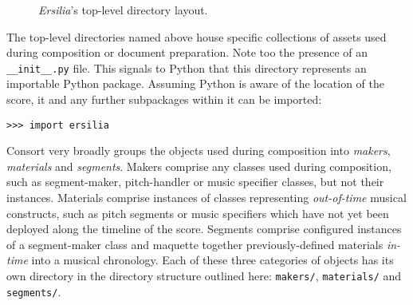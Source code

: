 \begin{figure}[h!]
\begin{singlespacing}
\vspace{-0.5\baselineskip}
\noindent%
\end{singlespacing}
\caption{\emph{Ersilia}'s top-level directory layout.}
\end{figure}

\noindent The top-level directories named above house specific collections of
assets used during composition or document preparation. Note too the presence
of an \texttt{\_\_init\_\_.py} file. This signals to Python that this directory
represents an importable Python package. Assuming Python is aware of the
location of the score, it and any further subpackages within it can be
imported:

\begin{comment}
<abjad>
import ersilia
</abjad>
\end{comment}

\begin{abjadbookoutput}
\begin{singlespacing}
\vspace{-0.5\baselineskip}
\begin{verbatim}
>>> import ersilia
\end{verbatim}
\end{singlespacing}
\end{abjadbookoutput}

\noindent Consort very broadly groups the objects used during composition into
\emph{makers}, \emph{materials} and \emph{segments}. Makers comprise any
classes used during composition, such as segment-maker, pitch-handler or music
specifier classes, but not their instances. Materials comprise instances of
classes representing \emph{out-of-time} musical constructs, such as pitch
segments or music specifiers which have not yet been deployed along the
timeline of the score. Segments comprise configured instances of a
segment-maker class and maquette together previously-defined materials
\emph{in-time} into a musical chronology. Each of these three categories of
objects has its own directory in the directory structure outlined here:
\texttt{makers/}, \texttt{materials/} and \texttt{segments/}.

